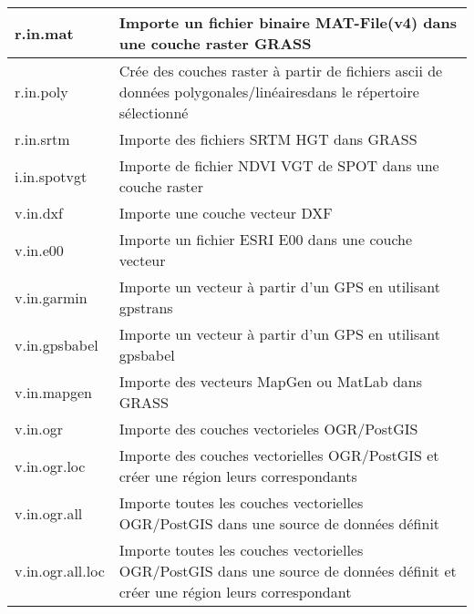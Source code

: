 \begin{table}[ht]
\begin{tabular}{|p{4cm}|p{12cm}|}
  \hline r.in.mat  & Importe un fichier binaire MAT-File(v4) dans une couche  raster GRASS \\
  \hline r.in.poly  & Cr\'ee des couches raster \`a partir de fichiers ascii de donn\'ees polygonales/lin\'eairesdans le r\'epertoire s\'electionn\'e \\
  \hline r.in.srtm  & Importe des fichiers SRTM HGT dans GRASS \\
  \hline i.in.spotvgt & Importe de fichier NDVI VGT de SPOT dans une couche raster \\
  \hline v.in.dxf & Importe une couche vecteur DXF \\
  \hline v.in.e00 & Importe un fichier ESRI E00 dans une couche vecteur \\
  \hline v.in.garmin & Importe un vecteur \`a partir d'un GPS en utilisant gpstrans \\
  \hline v.in.gpsbabel & Importe un vecteur \`a partir d'un GPS en utilisant gpsbabel \\
  \hline v.in.mapgen & Importe des vecteurs MapGen ou MatLab dans GRASS \\
  \hline v.in.ogr & Importe des couches vectorieles OGR/PostGIS \\
  \hline v.in.ogr.loc & Importe des couches vectorielles OGR/PostGIS et cr\'eer une r\'egion leurs correspondants\\
  \hline v.in.ogr.all & Importe toutes les couches vectorielles OGR/PostGIS dans une source de donn\'ees d\'efinit \\
  \hline v.in.ogr.all.loc & Importe toutes les couches vectorielles OGR/PostGIS dans une source de donn\'ees d\'efinit et cr\'eer une r\'egion leurs correspondant\\
\hline
\end{tabular}
\end{table}

